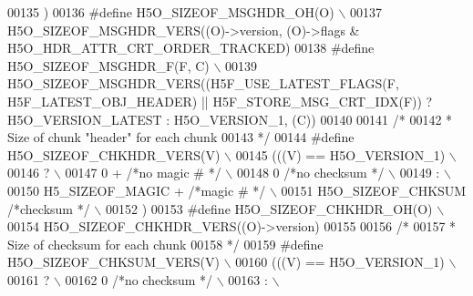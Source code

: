 \begin{DoxyCode}
00135 \textcolor{preprocessor}{    )}
00136 \textcolor{preprocessor}{#define H5O\_SIZEOF\_MSGHDR\_OH(O)                           \(\backslash\)}
00137 \textcolor{preprocessor}{    H5O\_SIZEOF\_MSGHDR\_VERS((O)->version, (O)->flags & H5O\_HDR\_ATTR\_CRT\_ORDER\_TRACKED)}
00138 \textcolor{preprocessor}{#define H5O\_SIZEOF\_MSGHDR\_F(F, C)                             \(\backslash\)}
00139 \textcolor{preprocessor}{    H5O\_SIZEOF\_MSGHDR\_VERS((H5F\_USE\_LATEST\_FLAGS(F, H5F\_LATEST\_OBJ\_HEADER) || H5F\_STORE\_MSG\_CRT\_IDX(F)) ?
       H5O\_VERSION\_LATEST : H5O\_VERSION\_1, (C))}
00140 
00141 \textcolor{comment}{/*}
00142 \textcolor{comment}{ * Size of chunk "header" for each chunk}
00143 \textcolor{comment}{ */}
00144 \textcolor{preprocessor}{#define H5O\_SIZEOF\_CHKHDR\_VERS(V)                         \(\backslash\)}
00145 \textcolor{preprocessor}{    (((V) == H5O\_VERSION\_1)                               \(\backslash\)}
00146 \textcolor{preprocessor}{        ?                                     \(\backslash\)}
00147 \textcolor{preprocessor}{            0 +     }\textcolor{comment}{/*no magic #  */}\textcolor{preprocessor}{                      \(\backslash\)}
00148 \textcolor{preprocessor}{                0   }\textcolor{comment}{/*no checksum */}\textcolor{preprocessor}{                      \(\backslash\)}
00149 \textcolor{preprocessor}{        :                                     \(\backslash\)}
00150 \textcolor{preprocessor}{            H5\_SIZEOF\_MAGIC +       }\textcolor{comment}{/*magic #  */}\textcolor{preprocessor}{                 \(\backslash\)}
00151 \textcolor{preprocessor}{                H5O\_SIZEOF\_CHKSUM   }\textcolor{comment}{/*checksum */}\textcolor{preprocessor}{                 \(\backslash\)}
00152 \textcolor{preprocessor}{    )}
00153 \textcolor{preprocessor}{#define H5O\_SIZEOF\_CHKHDR\_OH(O)                           \(\backslash\)}
00154 \textcolor{preprocessor}{    H5O\_SIZEOF\_CHKHDR\_VERS((O)->version)}
00155 
00156 \textcolor{comment}{/*}
00157 \textcolor{comment}{ * Size of checksum for each chunk}
00158 \textcolor{comment}{ */}
00159 \textcolor{preprocessor}{#define H5O\_SIZEOF\_CHKSUM\_VERS(V)                         \(\backslash\)}
00160 \textcolor{preprocessor}{    (((V) == H5O\_VERSION\_1)                               \(\backslash\)}
00161 \textcolor{preprocessor}{        ?                                     \(\backslash\)}
00162 \textcolor{preprocessor}{            0       }\textcolor{comment}{/*no checksum */}\textcolor{preprocessor}{                      \(\backslash\)}
00163 \textcolor{preprocessor}{        :                                     \(\backslash\)}

\end{DoxyCode}
